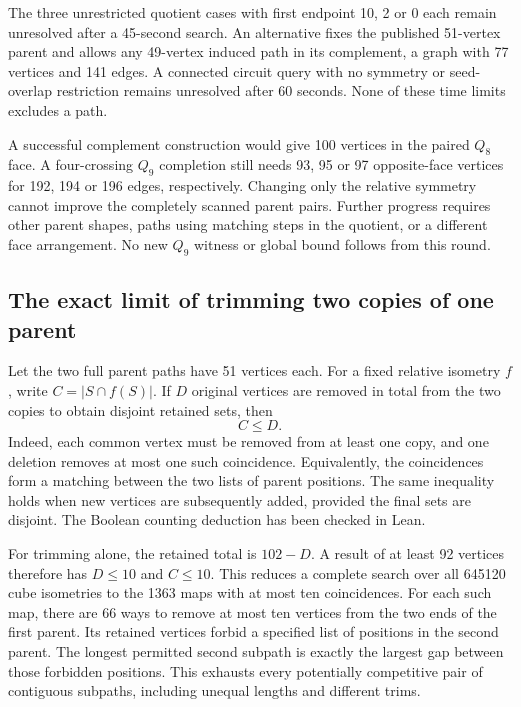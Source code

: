 \documentclass[11pt,a4paper]{article}
\theoremstyle{definition}
\theoremstyle{remark}
\begin{document}
The three unrestricted quotient cases with first endpoint 10, 2 or 0
each remain unresolved after a 45-second search. An alternative fixes
the published 51-vertex parent and allows any 49-vertex induced path
in its complement, a graph with 77 vertices and 141 edges. A connected
circuit query with no symmetry or seed-overlap restriction remains
unresolved after 60 seconds. None of these time limits excludes a path.

A successful complement construction would give 100 vertices in the
paired $Q_8$ face. A four-crossing $Q_9$ completion still needs 93,
95 or 97 opposite-face vertices for 192, 194 or 196 edges, respectively.
Changing only the relative symmetry cannot improve the completely
scanned parent pairs. Further progress requires other parent shapes,
paths using matching steps in the quotient, or a different face
arrangement. No new $Q_9$ witness or global bound follows from this round.


\subsection{The exact limit of trimming two copies of one parent}
\label{sec:repair200}

Let the two full parent paths have 51 vertices each. For a fixed relative
isometry $f$, write $C=|S\cap f(S)|$. If $D$ original vertices are removed
in total from the two copies to obtain disjoint retained sets, then
\[
C\le D.
\]
Indeed, each common vertex must be removed from at least one copy, and
one deletion removes at most one such coincidence. Equivalently, the
coincidences form a matching between the two lists of parent positions.
The same inequality holds when new vertices are subsequently added,
provided the final sets are disjoint. The Boolean counting deduction
has been checked in Lean.

For trimming alone, the retained total is $102-D$. A result of at least
92 vertices therefore has $D\le10$ and $C\le10$. This reduces a complete
search over all 645120 cube isometries to the 1363 maps with at most ten
coincidences. For each such map, there are 66 ways to remove at most ten
vertices from the two ends of the first parent. Its retained vertices
forbid a specified list of positions in the second parent. The longest
permitted second subpath is exactly the largest gap between those
forbidden positions. This exhausts every potentially competitive pair
of contiguous subpaths, including unequal lengths and different trims.
\end{document}
